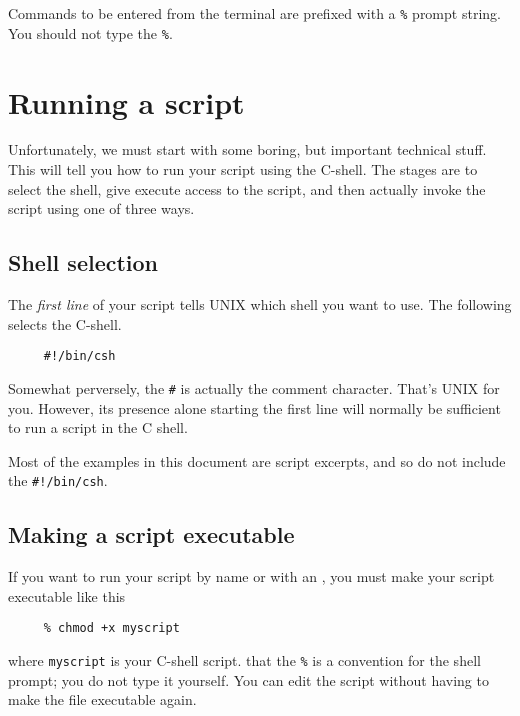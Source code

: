 Commands to be entered from the terminal are prefixed with a {\tt \%}
prompt string.  You should not type the {\tt \%}.

\newpage
\section{Running a script\label{sc4_se_running}}

Unfortunately, we must start with some boring, but important technical
stuff.  This will tell you how to run your script using the C-shell.  The
stages are to select the shell, give execute access to the script, and
then actually invoke the script using one of three ways.

\subsection{Shell selection\label{sc4_se_cshselect}}

The {\em first line\/} of your script tells UNIX which shell you want
to use.  The following selects the C-shell.

\small
\begin{verbatim}
     #!/bin/csh
\end{verbatim}
\normalsize
Somewhat perversely, the {\tt \#} is actually the comment character.
That's UNIX for you.  However, its presence alone starting the first
line will normally be sufficient to run a script in the C shell.

Most of the examples in this document are script excerpts, and so do not
include the \mbox{\tt \#!/bin/csh}.

\subsection{Making a script executable
\label{sc4_se_executable}}

If you want to run your script by name or with an , you must make your
script executable like this

\small
\begin{verbatim}
     % chmod +x myscript
\end{verbatim}
\normalsize
where {\tt myscript} is your C-shell script. 
that the {\tt \%} is a convention for the shell prompt; you do not type
it yourself.  You can edit the script without having to make the file
executable again.

